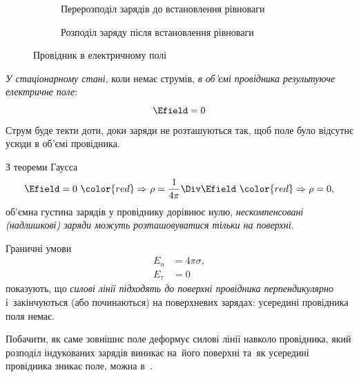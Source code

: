 \begin{figure}[h!]\centering
    \begin{subfigure}[t]{0.45\linewidth}\centering
        \caption{Перерозподіл зарядів до встановлення рівноваги}
    \end{subfigure}
    \begin{subfigure}[t]{0.45\linewidth}\centering
        \caption{Розподіл заряду після встановлення рівноваги}
    \end{subfigure}
    \caption{Провідник в електричному полі}
    \label{pic:MetallInField}
\end{figure}


\emph{У стаціонарному стані}, коли немає струмів, \emph{в об'ємі
    провідника результуюче електричне поле}:
\begin{equation}
    \Efield = 0
\end{equation}
Струм буде текти доти, доки заряди не розташуються так, щоб поле було
відсутнє усюди в об'ємі провідника.


З теореми Гаусса
\begin{equation*}
    \Efield = 0\ {\color{red}\Rightarrow}\ \rho = \frac1{4\pi} \Div\Efield\
    {\color{red}\Rightarrow}\ \rho = 0,
\end{equation*}
об'ємна густина зарядів у провіднику дорівнює нулю, \emph{нескомпенсовані (надлишкові) заряди можуть
    розташовуватися тільки на поверхні}.


Граничні умови
\begin{align*}
    E_n      & = 4\pi\sigma, \\
    E_{\tau} & = 0
\end{align*}
показують, що \emph{силові лінії підходять до поверхні провідника перпендикулярно} і~закінчуються
(або починаються) на поверхневих зарядах: усередині провідника поля немає.

\begin{Simulation}
Побачити, як саме зовнішнє поле деформує силові лінії навколо провідника, який розподіл
індукованих зарядів виникає на~його поверхні та~як усередині провідника зникає поле, можна
в~.
\end{Simulation}


